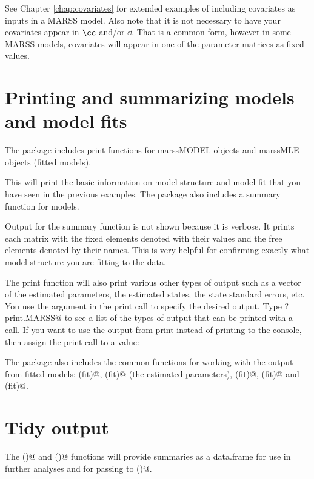 See Chapter \ref{chap:covariates} for extended examples of including covariates as inputs in a MARSS model.  Also note that it is not necessary to have your covariates appear in $\cc$ and/or $\dd$.  That is a common form, however in some MARSS models, covariates will appear in one of the parameter matrices as fixed values.

\section{Printing and summarizing models and model fits}
The package includes print functions for marssMODEL objects and marssMLE objects (fitted models).

This will print the basic information on model structure and model fit that you have seen in the previous examples.  The package also includes a summary function for models.

Output for the summary function is not shown because it is verbose. It prints each matrix with the fixed elements denoted with their values and the free elements denoted by their names.  This is very helpful for confirming exactly what model structure you are fitting to the data.

The print function will also print various other types of output such as a vector of the estimated parameters, the estimated states, the state standard errors, etc. You use the \verb@what@ argument in the print call to specify the desired output. Type \verb@?print.MARSS@ to see a list of the types of output that can be printed with a \verb@print@ call.  If you want to use the output from print instead of printing to the console, then assign the print call to a value:


The package also includes the common functions for working with the output from fitted models: \verb@residuals(fit)@, \verb@coef(fit)@ (the estimated parameters), \verb@fitted(fit)@, \verb@logLik(fit)@ and \verb@predict(fit)@.

\section{Tidy output}

The \verb@tidy()@ and \verb@glance()@ functions will provide summaries as a data.frame for use in further analyses and for passing to \verb@ggplot()@.

